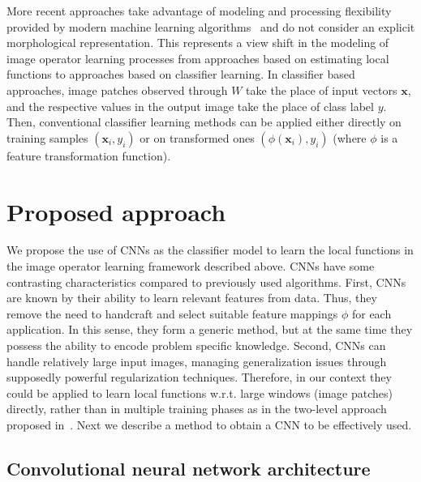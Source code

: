 \documentclass[conference]{IEEEtran}
\begin{document}
More recent approaches take advantage of modeling and processing
flexibility provided by modern machine learning
algorithms~\cite{2016:IgorICIP,2016:IgorSIB} and do not consider an
explicit morphological representation. This represents a view shift in
the modeling of image operator learning processes from approaches
based on estimating local functions to approaches based on classifier
learning. In classifier based approaches, image patches observed through
$W$ take the place of input vectors $\mathbf{x}$, and the respective
values in the output image take the place of class label $y$. Then,
conventional
classifier learning methods can be applied either directly on training
samples $(\mathbf{x}_i,y_i)$ or on transformed ones
$(\phi(\mathbf{x}_i),y_i)$ (where $\phi$ is a feature transformation
function).


\section{Proposed approach}
\label{sec:proposal}

We propose the use of CNNs as the classifier model to learn the local
functions in the image operator learning framework described
above. CNNs have some contrasting characteristics compared to
previously used algorithms. First, CNNs are known by their ability to
learn relevant features from data. Thus, they remove the need to
handcraft and select suitable feature mappings $\phi$ for each
application. In this sense, they form a generic method, but 
at the same time they possess the ability to encode problem specific
knowledge. Second, CNNs can handle relatively large input
images, managing generalization issues through supposedly powerful regularization
techniques. Therefore, in our context they could be applied to learn
local functions w.r.t. large windows (image patches) directly, rather
than in multiple training phases as in the two-level approach
proposed in~\cite{2009:Nina}. Next we describe a method to obtain a
CNN to be effectively used.

\subsection{Convolutional neural network architecture}
\end{document}
